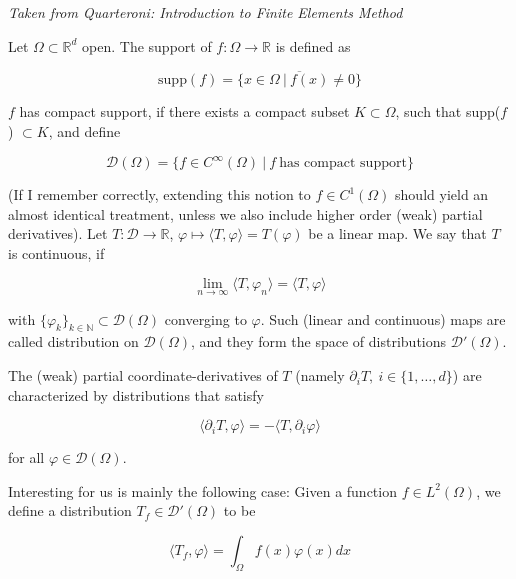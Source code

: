 \documentclass[11pt, a4paper]{article}
\begin{document}
\textit{Taken from Quarteroni: Introduction to Finite Elements Method}

Let $\Omega \subset \mathbb{R}^d$ open. The support of $f:\Omega \to \mathbb{R}$
is defined as

\begin{equation}
    \text{supp}(f) = \overline{\{x \in \Omega ~|~ f(x) \neq 0\}}
\end{equation}

$f$ has compact support, if there exists a compact subset $K \subset \Omega$,
such that supp($f$) $\subset K$, and define

\begin{equation}
    \mathcal{D}(\Omega) = \{f \in C^{\infty}(\Omega) ~|~ f ~\text{has compact support}\}
\end{equation}

(If I remember correctly, extending this notion to $f \in C^1(\Omega)$ should yield
an almost identical treatment, unless we also include higher order (weak) partial derivatives).
Let $T: \mathcal{D} \to \mathbb{R}$, $\varphi \mapsto \langle T, \varphi \rangle = T(\varphi)$
be a linear map. We say that $T$ is continuous, if

\begin{equation}
    \lim_{n\to\infty} \langle T, \varphi_n \rangle = \langle T, \varphi \rangle
\end{equation}

with $\{\varphi_k\}_{k \in \mathbb{N}} \subset \mathcal{D}(\Omega)$ converging to $\varphi$.
Such (linear and continuous) maps are called distribution on $\mathcal{D}(\Omega)$,
and they form the space of distributions $\mathcal{D}'(\Omega)$.

The (weak) partial coordinate-derivatives of $T$ (namely $\partial_i T, ~i \in \{1, \dots, d\}$)
are characterized by distributions that satisfy

\begin{equation}
    \langle \partial_i T, \varphi \rangle = - \langle T, \partial_i \varphi \rangle 
\end{equation}

for all $\varphi \in \mathcal{D}(\Omega)$. 

Interesting for us is mainly the following case:
Given a function $f \in L^2(\Omega)$, we define a distribution $T_f \in \mathcal{D}'(\Omega)$
to be 

\begin{equation}
    \langle T_f , \varphi \rangle = \int_{\Omega} f(x) \varphi(x) dx
\end{equation}
\end{document}
